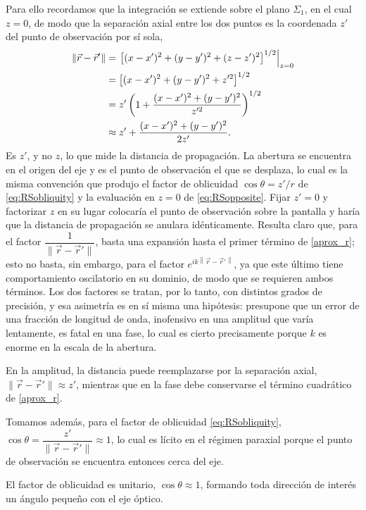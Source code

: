 Para ello recordamos que la integración se extiende sobre el plano $\Sigma_{1}$, en el cual $z=0$, de modo que la separación axial entre los dos puntos es la coordenada $z'$ del punto de observación por sí sola,
\begin{align}
	\label{aprox_r}
	\|\vec{r}-\vec{r}'\| &= \left.\left[(x-x')^2 + (y-y')^2 + (z-z')^2\right]^{1/2}\right|_{z=0} \notag \\
	&= \left[(x-x')^2 + (y-y')^2 + z'^2\right]^{1/2} \notag \\
	&= z'\left(1 + \dfrac{(x-x')^2 + (y-y')^2}{z'^2} \right)^{1/2} \notag \\
	&\approx z' + \dfrac{(x-x')^2+(y-y')^2}{2z'}.
\end{align}
Es $z'$, y no $z$, lo que mide la distancia de propagación. La abertura se encuentra en el origen del eje y es el punto de observación el que se desplaza, lo cual es la misma convención que produjo el factor de oblicuidad $\cos\theta = z'/r$ de \eqref{eq:RSobliquity} y la evaluación en $z=0$ de \eqref{eq:RSopposite}. Fijar $z'=0$ y factorizar $z$ en su lugar colocaría el punto de observación sobre la pantalla y haría que la distancia de propagación se anulara idénticamente.
Resulta claro que, para el factor $\dfrac{1}{\|\vec{r}- \vec{r}'\|}$, basta una expansión hasta el primer término de \eqref{aprox_r}; esto no basta, sin embargo, para el factor $e^{ik \left\| \vec{r} - \vec{r}' \right\|}$, ya que este último tiene comportamiento oscilatorio en su dominio, de modo que se requieren ambos términos. Los dos factores se tratan, por lo tanto, con distintos grados de precisión, y esa asimetría es en sí misma una hipótesis: presupone que un error de una fracción de longitud de onda, inofensivo en una amplitud que varía lentamente, es fatal en una fase, lo cual es cierto precisamente porque $k$ es enorme en la escala de la abertura.

\begin{Assumption}
	En la amplitud, la distancia puede reemplazarse por la separación axial, $\|\vec{r}-\vec{r}'\| \approx z'$, mientras que en la fase debe conservarse el término cuadrático de \eqref{aprox_r}.
\end{Assumption}

Tomamos además, para el factor de oblicuidad \eqref{eq:RSobliquity}, $\cos\theta = \dfrac{z'}{\|\vec{r} - \vec{r} '\|} \approx 1$, lo cual es lícito en el régimen paraxial porque el punto de observación se encuentra entonces cerca del eje.

\begin{Assumption}
	El factor de oblicuidad es unitario, $\cos\theta \approx 1$, formando toda dirección de interés un ángulo pequeño con el eje óptico.
\end{Assumption}

